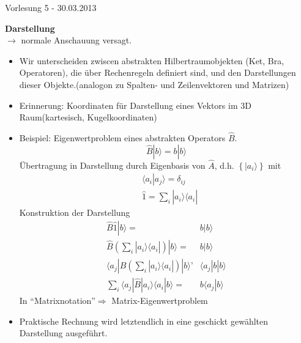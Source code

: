 \documentclass[10pt,article,colorback,accentcolor=tud9d]{scrartcl}
\begin{document}
\begin{fleqn}
\begin{flushright}
Vorlesung 5 - 30.03.2013
\end{flushright}
\textbf{Darstellung}\\
$\rightarrow$ normale Anschauung versagt.
\begin{itemize}
	\item Wir unterscheiden zwiscen abstrakten Hilbertraumobjekten (Ket, Bra, Operatoren), die über Rechenregeln definiert sind, und den Darstellungen dieser Objekte.(analogon zu Spalten- und Zeilenvektoren und Matrizen)
  \item Erinnerung: Koordinaten für Darstellung eines Vektors im 3D Raum(kartesisch, Kugelkoordinaten)
  \item Beispiel: Eigenwertproblem eines abstrakten Operators $\hat{B}$.
    \begin{equation}
    \hat{B}\left.\right|b\rangle =b\left.\right|b\rangle
    \end{equation}
    Übertragung in Darstellung durch Eigenbasis von $\hat{A}$, d.h. $\left\{\left.\right|a_i\rangle\right\}$ mit
    \begin{equation}
    \begin{aligned}
    &\langle a_i\left.\right|a_j\rangle=\delta_{ij}\\
    &\hat{1}=\sum_i\left.\right|a_i\rangle\langle a_i\left.\right|
    \end{aligned}
    \end{equation}
    Konstruktion der Darstellung
    \begin{equation}
    \begin{aligned}
      \hat{B}\hat{1}\left.\right|b\rangle=&b\left.\right|b\rangle\\
      \hat{B}\left(\sum_i\left.\right|a_i\rangle\langle a_i\left.\right|\right)\left.\right|b\rangle=&b\left.\right|b\rangle\\
      \langle a_j\left.\right|\hat{B}\left(\sum_i\left.\right|a_i\rangle\langle a_i\left.\right|\right)\left.\right|b\rangle’&\langle a_j\left.\right|b\left.\right|b\rangle\\
      \sum_i\langle a_j\left.\right|\hat{B}\left.\right|a_i\rangle\langle a_i\left.\right|b\rangle =&b\langle a_j\left.\right|b\rangle      
    \end{aligned}
    \end{equation}
  In "`Matrixnotation"'$\Rightarrow$ Matrix-Eigenwertproblem %
\item Praktische Rechnung wird letztendlich in eine geschickt gewählten Darstellung ausgeführt.

\end{itemize}
\end{fleqn}
\end{document}
